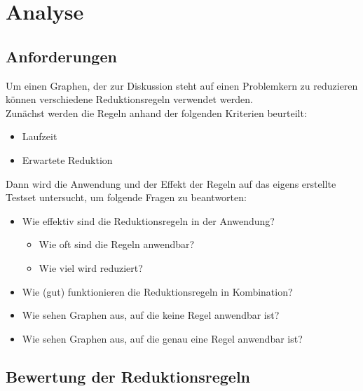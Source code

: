 
\chapter{Analyse}
\label{ch:Analyse}




\section{Anforderungen}
\label{ch:Analyse:sec:Anforderungen}

Um einen Graphen, der zur Diskussion steht auf einen Problemkern zu reduzieren können verschiedene Reduktionsregeln verwendet werden. \\
Zunächst werden die Regeln anhand der folgenden Kriterien beurteilt:
\begin{itemize}
	\item Laufzeit
	\item Erwartete Reduktion
\end{itemize}
Dann wird die Anwendung und der Effekt der Regeln auf das eigens erstellte Testset untersucht, um folgende Fragen zu beantworten:
\begin{itemize}
\item Wie effektiv sind die Reduktionsregeln in der Anwendung?
	\begin{itemize}
		\item Wie oft sind die Regeln anwendbar?
		\item Wie viel wird reduziert?
	\end{itemize}
\item Wie (gut) funktionieren die Reduktionsregeln in Kombination?
\item Wie sehen Graphen aus, auf die keine Regel anwendbar ist?
\item Wie sehen Graphen aus, auf die genau eine Regel anwendbar ist?
\end{itemize}

\section{Bewertung der Reduktionsregeln}
\label{ch:Analyse:sec:Berwertung}

